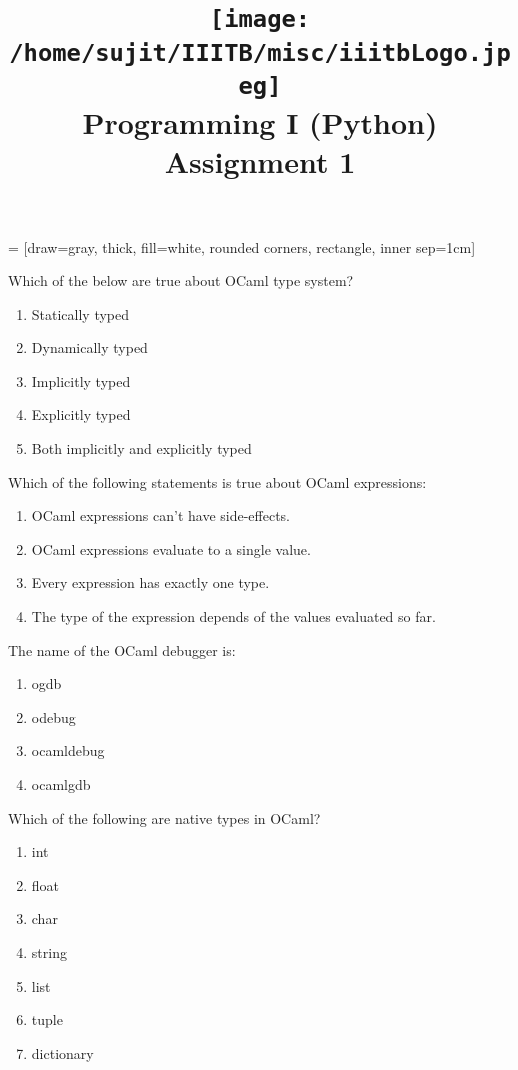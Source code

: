 \documentclass[addpoints,11pt]{exam}
\author{}
\title{\texttt{[image: /home/sujit/IIITB/misc/iiitbLogo.jpeg]} \\ Programming I (Python) \\ Assignment 1}
\date{}
\begin{document}
   = [draw=gray, thick, fill=white, rounded corners, rectangle, inner sep=1cm]
\maketitle


\thispagestyle{head}
\begin{questions}
\question Which of the below are true about OCaml type system?
\begin{enumerate}
  \item Statically typed
  \item Dynamically typed
  \item Implicitly typed
  \item Explicitly typed
  \item Both implicitly and explicitly typed
\end{enumerate} 
\question Which of the following statements is true about OCaml expressions:
\begin{enumerate}
\item OCaml expressions can't have side-effects.
\item OCaml expressions evaluate to a single value.
\item Every expression has exactly one type.
\item The type of the expression depends of the values evaluated so far.
\end{enumerate}\question The name of the OCaml debugger is:
\begin{enumerate}
\item ogdb
\item odebug
\item ocamldebug
\item ocamlgdb
\end{enumerate}\question Which of the following are native types in OCaml?
\begin{enumerate}
\item int
\item float
\item char
\item string
\item list
\item tuple
\item dictionary

\end{enumerate}
\end{questions}
\end{document}
